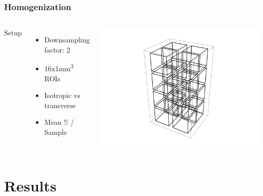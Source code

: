 \documentclass[xcolor=table,11pt]{beamer}
\begin{document}
	\begin{frame}
		\frametitle{Homogenization}

		\begin{columns}
			\vfill
			Setup
			\begin{itemize}
				\item Downsampling factor: 2
				\item 16x1mm\textsuperscript{3} ROIs
				\item Isotropic vs transverse
				\item Mean $\mathbb{S}$ / Sample
			\end{itemize}
			\vfill

			\vfill
			\includegraphics[width=\linewidth, trim=200 0 0 0]{05_Homogenization/Plots/ROIs}\\
			\vfill

		\end{columns}
	\end{frame}

	\section{Results}
\end{document}

